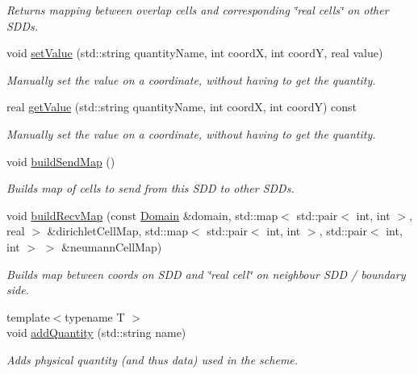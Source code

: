 \begin{DoxyCompactItemize}
\begin{DoxyCompactList}\small\item\em Returns mapping between overlap cells and corresponding \char`\"{}real cells\char`\"{} on other S\+D\+Ds. \end{DoxyCompactList}\item 
void \mbox{\hyperlink{classSDDistributed_ae9d8db949ba9da0a95407e1066df17b9}{set\+Value}} (std\+::string quantity\+Name, int coordX, int coordY, real value)
\begin{DoxyCompactList}\small\item\em Manually set the value on a coordinate, without having to get the quantity. \end{DoxyCompactList}\item 
real \mbox{\hyperlink{classSDDistributed_a1db6a1bf2f8781b9e4b12be99b4bf9c4}{get\+Value}} (std\+::string quantity\+Name, int coordX, int coordY) const
\begin{DoxyCompactList}\small\item\em Manually set the value on a coordinate, without having to get the quantity. \end{DoxyCompactList}\item 
void \mbox{\hyperlink{classSDDistributed_a32d97f1dcac80c2f61124460149fb0fb}{build\+Send\+Map}} ()
\begin{DoxyCompactList}\small\item\em Builds map of cells to send from this S\+DD to other S\+D\+Ds. \end{DoxyCompactList}\item 
void \mbox{\hyperlink{classSDDistributed_a55650dabf89c711ac07e5795e1b87b17}{build\+Recv\+Map}} (const \mbox{\hyperlink{classDomain}{Domain}} \&domain, std\+::map$<$ std\+::pair$<$ int, int $>$, real $>$ \&dirichlet\+Cell\+Map, std\+::map$<$ std\+::pair$<$ int, int $>$, std\+::pair$<$ int, int $>$ $>$ \&neumann\+Cell\+Map)
\begin{DoxyCompactList}\small\item\em Builds map between coords on S\+DD and \char`\"{}real cell\char`\"{} on neighbour S\+DD / boundary side. \end{DoxyCompactList}\item 
{\footnotesize template$<$typename T $>$ }\\void \mbox{\hyperlink{classSDDistributed_a82b5a390e964051d1952c683b4fa5f05}{add\+Quantity}} (std\+::string name)
\begin{DoxyCompactList}\small\item\em Adds physical quantity (and thus data) used in the scheme. \end{DoxyCompactList}\item 

\end{DoxyCompactItemize}
